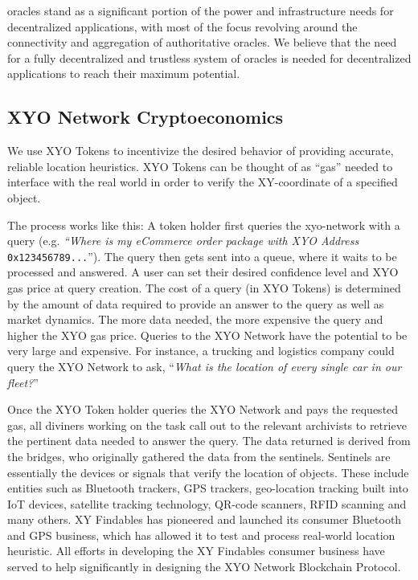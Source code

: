 \documentclass{article}
\begin{document}
\Glspl{oracle} stand as a significant portion of the power and infrastructure needs for decentralized applications, with most of the focus revolving around the connectivity and aggregation of authoritative oracles. We believe that the need for a fully decentralized and \gls{trustless} system of oracles is needed for decentralized applications to reach their maximum potential.


\subsection {XYO Network Cryptoeconomics}
We use XYO Tokens to incentivize the desired behavior of providing accurate, reliable location \glspl{heuristic}. XYO Tokens can be thought of as ``gas'' needed to interface with the real world in order to verify the XY-coordinate of a specified object.

The process works like this: A token holder first queries the \Gls{xyo-network} with a query (e.g. \textit{``Where is my eCommerce order package with XYO Address} \texttt{0x123456789...}''). The query then gets sent into a queue, where it waits to be processed and answered. A user can set their desired confidence level and XYO gas price at query creation. The cost of a query (in XYO Tokens) is determined by the amount of data required to provide an answer to the query as well as market dynamics.  The more data needed, the more expensive the query and higher the XYO gas price. Queries to the XYO Network have the potential to be very large and expensive. For instance, a trucking and logistics company could query the XYO Network to ask, ``\textit{What is the location of every single car in our fleet?}''

Once the XYO Token holder queries the XYO Network and pays the requested gas, all \Glspl{diviner} working on the task call out to the relevant \Glspl{archivist} to retrieve the pertinent data needed to answer the query. The data returned is derived from the \Glspl{bridge}, who originally gathered the data from the \Glspl{sentinel}. Sentinels are essentially the devices or signals that verify the location of objects. These include entities such as Bluetooth trackers, GPS trackers, geo-location tracking built into IoT devices, satellite tracking technology, QR-code scanners, RFID scanning and many others. XY Findables has pioneered and launched its consumer Bluetooth and GPS business, which has allowed it to test and process real-world location heuristic. All efforts in developing the XY Findables consumer business have served to help significantly in designing the XYO Network Blockchain Protocol.
\end{document}
